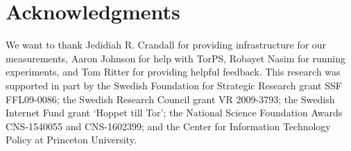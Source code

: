 \section*{Acknowledgments}
We want to thank Jedidiah R. Crandall for providing infrastructure for our
measurements, Aaron Johnson for help with TorPS, Robayet Nasim for running
\name experiments, and Tom Ritter for providing
helpful feedback.
%
This research was supported in part by the Swedish Foundation for Strategic
Research grant SSF FFL09-0086; the Swedish Research Council grant VR 2009-3793;
the Swedish Internet Fund grant `Hoppet till Tor'; the National Science
Foundation Awards CNS-1540055 and CNS-1602399; and the Center for Information
Technology Policy at Princeton University.
